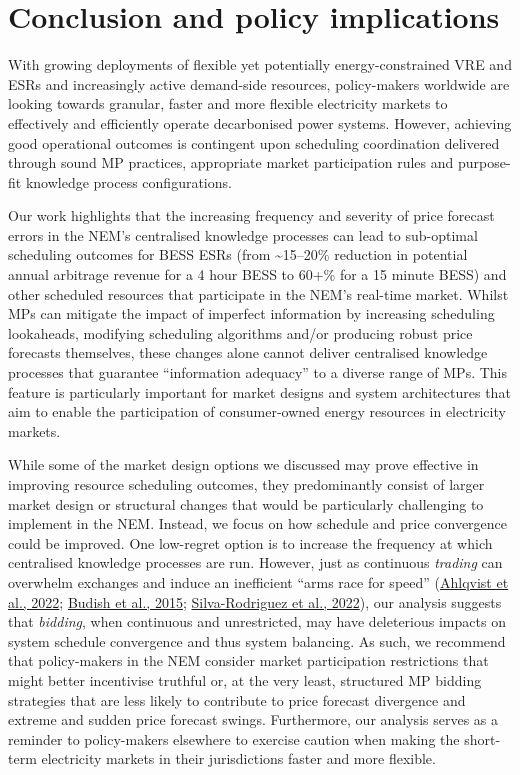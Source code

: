 \documentclass[12pt,a4paper,]{report}
\begin{document}
\hypertarget{sec:info-conclusion}{%
\section{Conclusion and policy implications}\label{sec:info-conclusion}}

With growing deployments of flexible yet potentially energy-constrained
VRE and ESRs and increasingly active demand-side resources,
policy-makers worldwide are looking towards granular, faster and more
flexible electricity markets to effectively and efficiently operate
decarbonised power systems. However, achieving good operational outcomes
is contingent upon scheduling coordination delivered through sound MP
practices, appropriate market participation rules and purpose-fit
knowledge process configurations.

Our work highlights that the increasing frequency and severity of price
forecast errors in the NEM's centralised knowledge processes can lead to
sub-optimal scheduling outcomes for BESS ESRs (from
\textasciitilde15--20\% reduction in potential annual arbitrage revenue
for a 4 hour BESS to 60+\% for a 15 minute BESS) and other scheduled
resources that participate in the NEM's real-time market. Whilst MPs can
mitigate the impact of imperfect information by increasing scheduling
lookaheads, modifying scheduling algorithms and/or producing robust
price forecasts themselves, these changes alone cannot deliver
centralised knowledge processes that guarantee ``information adequacy''
to a diverse range of MPs. This feature is particularly important for
market designs and system architectures that aim to enable the
participation of consumer-owned energy resources in electricity markets.

While some of the market design options we discussed may prove effective
in improving resource scheduling outcomes, they predominantly consist of
larger market design or structural changes that would be particularly
challenging to implement in the NEM. Instead, we focus on how schedule
and price convergence could be improved. One low-regret option is to
increase the frequency at which centralised knowledge processes are run.
However, just as continuous \emph{trading} can overwhelm exchanges and
induce an inefficient ``arms race for speed''
(\protect\hyperlink{ref-ahlqvistSurveyComparingCentralized2022}{Ahlqvist
et al., 2022};
\protect\hyperlink{ref-budishHighFrequencyTradingArms2015}{Budish et
al., 2015};
\protect\hyperlink{ref-silva-rodriguezShortTermWholesale2022}{Silva-Rodriguez
et al., 2022}), our analysis suggests that \emph{bidding}, when
continuous and unrestricted, may have deleterious impacts on system
schedule convergence and thus system balancing. As such, we recommend
that policy-makers in the NEM consider market participation restrictions
that might better incentivise truthful or, at the very least, structured
MP bidding strategies that are less likely to contribute to price
forecast divergence and extreme and sudden price forecast swings.
Furthermore, our analysis serves as a reminder to policy-makers
elsewhere to exercise caution when making the short-term electricity
markets in their jurisdictions faster and more flexible.
\end{document}
